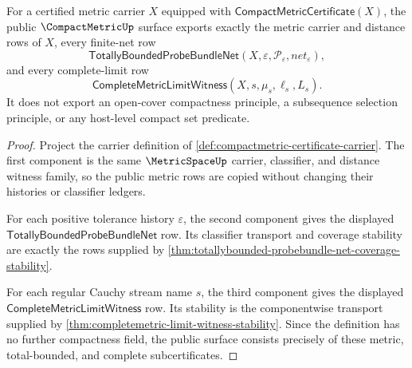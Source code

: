 \begin{theorem}
\label{thm:compactmetric-public-export-surface}
For a certified metric carrier $X$ equipped with
$\mathsf{CompactMetricCertificate}(X)$, the public $\CompactMetricUp$ surface
exports exactly the metric carrier and distance rows of $X$, every finite-net
row
$$
\mathsf{TotallyBoundedProbeBundleNet}(X,\varepsilon,\mathcal{P}_{\varepsilon},net_{\varepsilon}),
$$
and every complete-limit row
$$
\mathsf{CompleteMetricLimitWitness}(X,s,\mu_s,\ell_s,L_s).
$$
It does not export an open-cover compactness principle, a subsequence
selection principle, or any host-level compact set predicate.
\end{theorem}
\begin{proof}
Project the carrier definition of
\autoref{def:compactmetric-certificate-carrier}. The first component is the
same $\MetricSpaceUp$ carrier, classifier, and distance witness family, so the
public metric rows are copied without changing their histories or classifier
ledgers.

For each positive tolerance history $\varepsilon$, the second component gives
the displayed $\mathsf{TotallyBoundedProbeBundleNet}$ row. Its classifier
transport and coverage stability are exactly the rows supplied by
\autoref{thm:totallybounded-probebundle-net-coverage-stability}.

For each regular Cauchy stream name $s$, the third component gives the
displayed $\mathsf{CompleteMetricLimitWitness}$ row. Its stability is the
componentwise transport supplied by
\autoref{thm:completemetric-limit-witness-stability}. Since the definition
has no further compactness field, the public surface consists precisely of
these metric, total-bounded, and complete subcertificates.
\end{proof}

